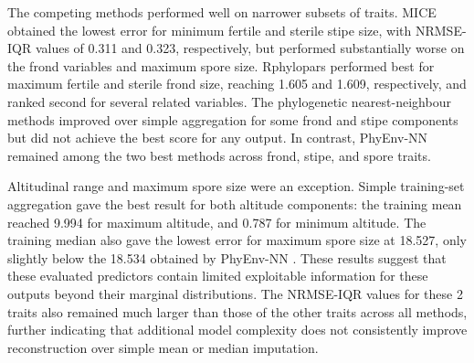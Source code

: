\documentclass[preprint,12pt,authoryear]{elsarticle}
\newcommand{\awesomeModel}{PhyEnv-NN }
\begin{document}
The competing methods performed well on narrower subsets of traits. MICE obtained the lowest error for minimum fertile and sterile stipe size, with NRMSE-IQR values of 0.311 and 0.323, respectively, but performed substantially worse on the frond variables and maximum spore size. Rphylopars performed best for maximum fertile and sterile frond size, reaching 1.605 and 1.609, respectively, and ranked second for several related variables. The phylogenetic nearest-neighbour methods improved over simple aggregation for some frond and stipe components but did not achieve the best score for any output. In contrast, \awesomeModel remained among the two best methods across frond, stipe, and spore traits.

Altitudinal range and maximum spore size were an exception. Simple training-set aggregation gave the best result for both altitude components: the training mean reached 9.994 for maximum altitude, and 0.787 for minimum altitude. The training median also gave the lowest error for maximum spore size at 18.527, only slightly below the 18.534 obtained by \awesomeModel. These results suggest that these evaluated predictors contain limited exploitable information for these outputs beyond their marginal distributions. The NRMSE-IQR values for these 2 traits also remained much larger than those of the other traits across all methods, further indicating that additional model complexity does not consistently improve reconstruction over simple mean or median imputation.
\end{document}
